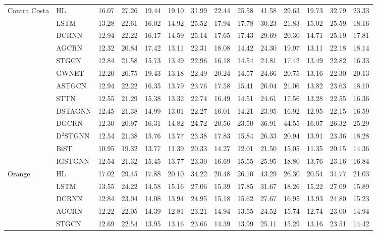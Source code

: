\begin{table}
\begin{tabular}{llrrrrrrrrrrrr}
\midrule
\multirow{13}{*}{Contra Costa} & HL & 16.07 & 27.26 & 19.44 & 19.10 & 31.99 & 22.44 & 25.58 & 41.58 & 29.63 & 19.73 & 32.79 & 23.33 \\
 & LSTM & 13.28 & 22.61 & 16.02 & 14.92 & 25.52 & 17.94 & 17.78 & 30.23 & 21.83 & 15.02 & 25.59 & 18.16 \\
 & DCRNN & 12.94 & 22.22 & 16.17 & 14.59 & 25.14 & 17.65 & 17.43 & 29.69 & 20.30 & 14.71 & 25.19 & 17.81 \\
 & AGCRN & 12.32 & 20.84 & 17.42 & 13.11 & 22.31 & 18.08 & 14.42 & 24.30 & 19.97 & 13.11 & 22.18 & 18.14 \\
 & STGCN & 12.84 & 21.58 & 15.73 & 13.49 & 22.96 & 16.18 & 14.54 & 24.81 & 17.42 & 13.49 & 22.82 & 16.33 \\
 & GWNET & 12.20 & 20.75 & 19.43 & 13.18 & 22.49 & 20.24 & 14.57 & 24.66 & 20.75 & 13.16 & 22.30 & 20.13 \\
 & ASTGCN & 12.94 & 22.22 & 16.35 & 13.79 & 23.76 & 17.58 & 15.41 & 26.04 & 21.06 & 13.82 & 23.63 & 18.10 \\
 & STTN & 12.55 & 21.29 & 15.38 & 13.32 & 22.74 & 16.49 & 14.51 & 24.61 & 17.56 & 13.28 & 22.55 & 16.36 \\
 & DSTAGNN & 12.45 & 21.38 & 14.99 & 13.01 & 22.27 & 16.01 & 14.21 & 23.95 & 16.92 & 12.95 & 22.15 & 16.59 \\
 & DGCRN & 12.30 & 20.97 & 16.31 & 14.82 & 24.72 & 20.56 & 23.50 & 36.91 & 44.55 & 16.07 & 26.32 & 25.29 \\
 & D$^2$STGNN & 12.54 & 21.38 & 15.76 & 13.77 & 23.38 & 17.83 & 15.84 & 26.33 & 20.94 & 13.91 & 23.36 & 18.28 \\
 & BiST & 10.95 & 19.32 & 13.77 & 11.39 & 20.33 & 14.27 & 12.01 & 21.50 & 15.05 & 11.35 & 20.15 & 14.36 \\
 & IGSTGNN & 12.54 & 21.32 & 15.45 & 13.77 & 23.30 & 16.69 & 15.55 & 25.95 & 18.80 & 13.76 & 23.16 & 16.84 \\
\midrule
\multirow{13}{*}{Orange} & HL & 17.02 & 29.45 & 17.88 & 20.10 & 34.22 & 20.48 & 26.10 & 43.29 & 26.30 & 20.54 & 34.77 & 21.03 \\
 & LSTM & 13.55 & 24.22 & 14.58 & 15.16 & 27.06 & 15.39 & 17.85 & 31.67 & 18.26 & 15.22 & 27.09 & 15.89 \\
 & DCRNN & 12.84 & 23.04 & 14.08 & 13.94 & 24.95 & 15.18 & 15.62 & 27.67 & 16.95 & 13.93 & 24.80 & 15.23 \\
 & AGCRN & 12.22 & 22.05 & 14.39 & 12.81 & 23.21 & 14.94 & 13.55 & 24.52 & 15.74 & 12.74 & 23.00 & 14.94 \\
 & STGCN & 12.69 & 22.54 & 13.95 & 13.16 & 23.66 & 14.39 & 13.99 & 25.11 & 15.29 & 13.16 & 23.51 & 14.42 \\

\end{tabular}
\end{table}
